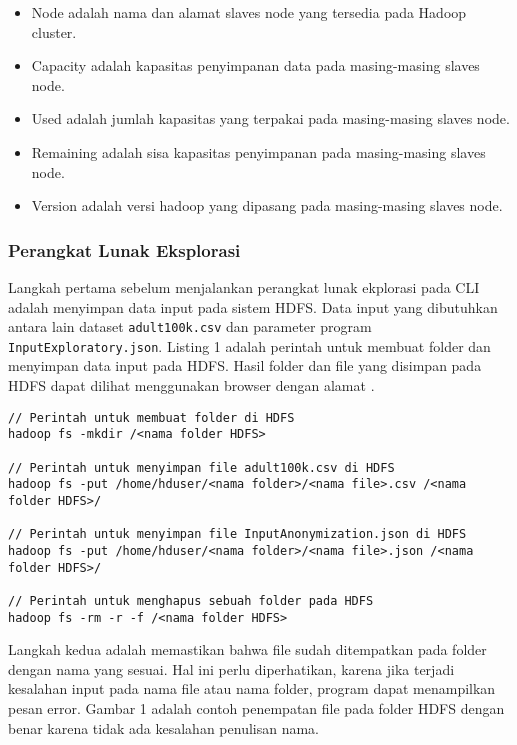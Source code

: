 \begin{itemize}
\item Node adalah nama dan alamat slaves node yang tersedia pada Hadoop cluster.
\item Capacity adalah kapasitas penyimpanan data pada masing-masing slaves node.
\item Used adalah jumlah kapasitas yang terpakai pada masing-masing slaves node.
\item Remaining adalah sisa kapasitas penyimpanan pada masing-masing slaves node.
\item Version adalah versi hadoop yang dipasang pada masing-masing slaves node.
\end{itemize}

\subsubsection{Perangkat Lunak Eksplorasi}

Langkah pertama sebelum menjalankan perangkat lunak ekplorasi pada CLI adalah menyimpan data input pada sistem HDFS. Data input yang dibutuhkan antara lain dataset \texttt{adult100k.csv} dan parameter program \texttt{InputExploratory.json}. Listing 1 adalah perintah untuk membuat folder dan menyimpan data input pada HDFS. Hasil folder dan file yang disimpan pada HDFS dapat dilihat menggunakan browser dengan alamat .

\begin{lstlisting}[basicstyle=\ttfamily, frame=single,
	columns=fullflexible, keepspaces=true, breaklines=true, label=lst:pl_csv, caption=Perintah Spark untuk Perangkat Lunak Eksplorasi]
// Perintah untuk membuat folder di HDFS
hadoop fs -mkdir /<nama folder HDFS>

// Perintah untuk menyimpan file adult100k.csv di HDFS
hadoop fs -put /home/hduser/<nama folder>/<nama file>.csv /<nama folder HDFS>/

// Perintah untuk menyimpan file InputAnonymization.json di HDFS
hadoop fs -put /home/hduser/<nama folder>/<nama file>.json /<nama folder HDFS>/

// Perintah untuk menghapus sebuah folder pada HDFS
hadoop fs -rm -r -f /<nama folder HDFS>

\end{lstlisting}

\newpage
Langkah kedua adalah memastikan bahwa file sudah ditempatkan pada folder dengan nama yang sesuai. Hal ini perlu diperhatikan, karena jika terjadi kesalahan input pada nama file atau nama folder, program dapat menampilkan pesan error. Gambar 1 adalah contoh penempatan file pada folder HDFS dengan benar karena tidak ada kesalahan penulisan nama.

